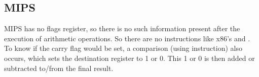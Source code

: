 \fi

\ifdefined\IncludeMIPS
\subsection{MIPS}



MIPS has no flags register, so there is no such information present after the execution of arithmetic operations.
So there are no instructions like x86's  and .
To know if the carry flag would be set, a comparison (using  instruction) also occurs, 
which sets the destination register to 1 or 0.
This 1 or 0 is then added or subtracted to/from the final result.

\fi
